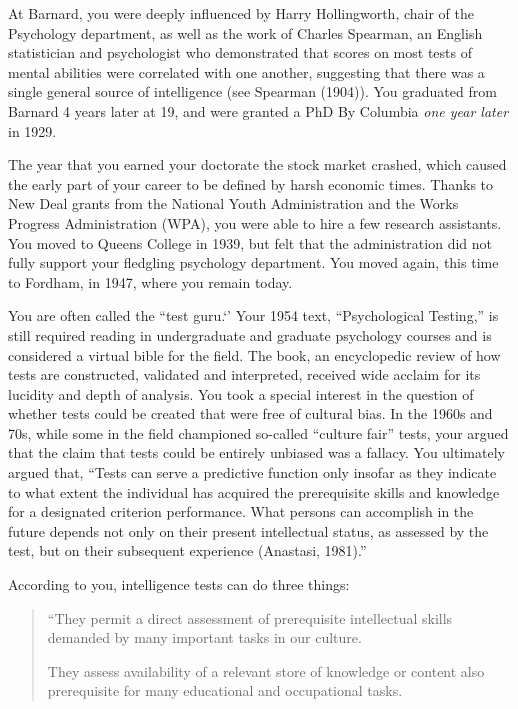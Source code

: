 \begin{refsection}
At Barnard, you were deeply influenced by Harry Hollingworth, chair of the Psychology department, as well as the work of Charles Spearman, an English statistician and psychologist who demonstrated that scores on most tests of mental abilities were correlated with one another, suggesting that there was a single general source of intelligence (see Spearman (1904)). You graduated from Barnard 4 years later at 19, and were granted a PhD By Columbia \emph{one year later} in 1929.

The year that you earned your doctorate the stock market crashed, which caused the early part of your career to be defined by harsh economic times. Thanks to New Deal grants from the National Youth Administration and the Works Progress Administration (WPA), you were able to hire a few research assistants. You moved to Queens College in 1939, but felt that the administration did not fully support your fledgling psychology department. You moved again, this time to Fordham, in 1947, where you remain today.

You are often called the “test guru.`' Your 1954 text, ``Psychological Testing,'' is still required reading in undergraduate and graduate psychology courses and is considered a virtual bible for the field. The book, an encyclopedic review of how tests are constructed, validated and interpreted, received wide acclaim for its lucidity and depth of analysis. You took a special interest in the question of whether tests could be created that were free of cultural bias. In the 1960s and 70s, while some in the field championed so-called ``culture fair'' tests, your argued that the claim that tests could be entirely unbiased was a fallacy. You ultimately argued that, “Tests can serve a predictive function only insofar as they indicate to what extent the individual has acquired the prerequisite skills and knowledge for a designated criterion performance. What persons can accomplish in the future depends not only on their present intellectual status, as assessed by the test, but on their subsequent experience (Anastasi, 1981).”

According to you, intelligence tests can do three things:

\begin{quote}

“They permit a direct assessment of prerequisite intellectual skills demanded by many important tasks in our culture.

They assess availability of a relevant store of knowledge or content also prerequisite for many educational and occupational tasks.


\end{quote}
\end{refsection}
